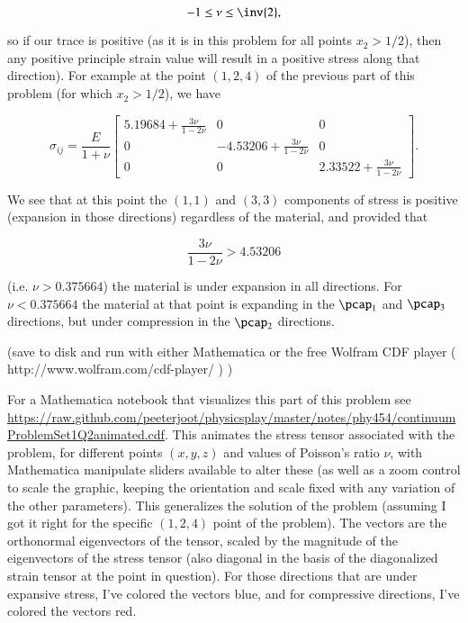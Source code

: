 \begin{equation}\label{eqn:continuumProblemSet1:350}
-1 \le \nu \le \inv{2},
\end{equation}

so if our trace is positive (as it is in this problem for all points $x_2 > 1/2$), then any positive principle strain value will result in a positive stress along that direction).  For example at the point $(1,2,4)$ of the previous part of this problem (for which $x_2 > 1/2$), we have

\begin{equation}\label{eqn:continuumProblemSet1:370}
\sigma_{ij}
=
\frac{E}{1 + \nu}
\begin{bmatrix}
5.19684
+ \frac{3 \nu}{1 - 2 \nu}  & 0 & 0 \\
0 & -4.53206
+ \frac{3 \nu}{1 - 2 \nu}  & 0 \\
0 & 0 & 2.33522
+ \frac{3 \nu}{1 - 2 \nu}
\end{bmatrix}.
\end{equation}

We see that at this point the $(1,1)$ and $(3,3)$ components of stress is positive (expansion in those directions) regardless of the material, and provided that

\begin{equation}\label{eqn:continuumProblemSet1:390}
\frac{3 \nu}{1 - 2 \nu} > 4.53206
\end{equation}

(i.e. $\nu > 0.375664$) the material is under expansion in all directions.  For $\nu < 0.375664$ the material at that point is expanding in the $\pcap_1$ and $\pcap_3$ directions, but under compression in the $\pcap_2$ directions.

(save to disk and run with either Mathematica or the free Wolfram CDF player ( http://www.wolfram.com/cdf-player/  ) )

For a Mathematica notebook that visualizes this part of this problem see \href{https://raw.github.com/peeterjoot/physicsplay/master/notes/phy454/continuumProblemSet1Q2animated.cdf}{https://raw.github.com/peeterjoot/physicsplay/master/notes/phy454/continuumProblemSet1Q2animated.cdf}.  This animates the stress tensor associated with the problem, for different points $(x,y,z)$ and values of Poisson's ratio $\nu$, with Mathematica manipulate sliders available to alter these (as well as a zoom control to scale the graphic, keeping the orientation and scale fixed with any variation of the other parameters).  This generalizes the solution of the problem (assuming I got it right for the specific $(1,2,4)$ point of the problem).  The vectors are the orthonormal eigenvectors of the tensor, scaled by the magnitude of the eigenvectors of the stress tensor (also diagonal in the basis of the diagonalized strain tensor at the point in question).  For those directions that are under expansive stress, I've colored the vectors blue, and for compressive directions, I've colored the vectors red.

